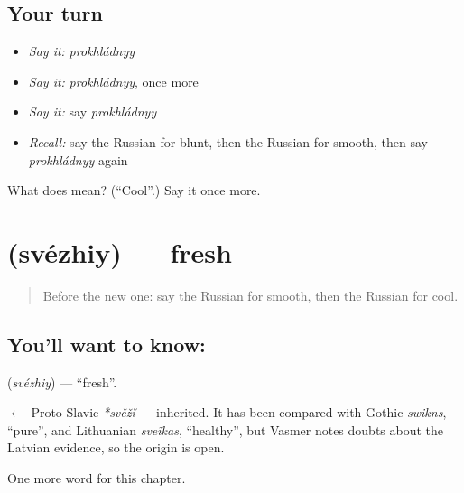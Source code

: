\subsection*{Your turn}
\begin{itemize}
\raggedright
  \item \emph{Say it:} \emph{prokhládnyy}
  \item \emph{Say it:} \emph{prokhládnyy}, once more
  \item \emph{Say it:} say \emph{prokhládnyy}
  \item \emph{Recall:} say the Russian for blunt, then the Russian for smooth, then say \emph{prokhládnyy} again
\end{itemize}

\begin{tcolorbox}[breakable,colback=teal!4,colframe=teal!35!black,title={Before you move on}]
What does  mean? (\textquotedblleft{}Cool\textquotedblright{}.) Say it once more.
\end{tcolorbox}
\section[\texorpdfstring{\ru{свежий} (svézhiy)}{свежий (svézhiy)}]{ (svézhiy) — fresh}

\label{lesson:RU-C217-svezhiy}



\begin{quote}
Before the new one: say the Russian for smooth, then the Russian for cool.
\end{quote}

\subsection*{You'll want to know: }
\textbf{} (\emph{svézhiy}) — \textquotedblleft{}fresh\textquotedblright{}.

\begin{cousinweb}
\textbf{} $\leftarrow$ Proto-Slavic \emph{*svěžĭ} — inherited. It has been compared with Gothic \emph{swikns}, \textquotedblleft{}pure\textquotedblright{}, and Lithuanian \emph{sveĩkas}, \textquotedblleft{}healthy\textquotedblright{}, but Vasmer notes doubts about the Latvian evidence, so the origin is open.
\end{cousinweb}

\begin{grammarlens}[title={What you've built}]
One more word for this chapter.
\end{grammarlens}

